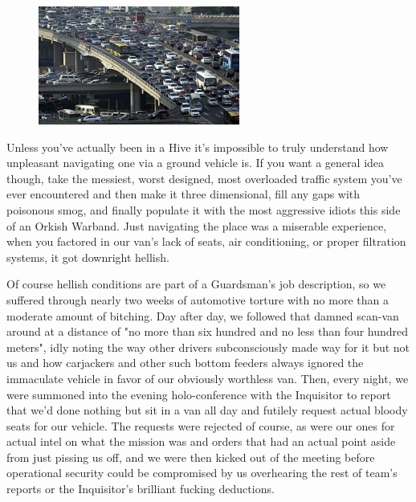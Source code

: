 \begin{figure}
	\begin{center}
		\includegraphics[width=\figwidth]{pics/17/30.png}
	\end{center}
\end{figure}
Unless you've actually been in a Hive it's impossible to truly understand how unpleasant navigating one via a ground vehicle is. 
If you want a general idea though, take the messiest, worst designed, most overloaded traffic system you've ever encountered and then make it three dimensional, fill any gaps with poisonous smog, and finally populate it with the most aggressive idiots this side of an Orkish Warband. 
Just navigating the place was a miserable experience, when you factored in our van's lack of seats, air conditioning, or proper filtration systems, it got downright hellish.

Of course hellish conditions are part of a Guardsman's job description, so we suffered through nearly two weeks of automotive torture with no more than a moderate amount of bitching. 
Day after day, we followed that damned scan-van around at a distance of "no more than six hundred and no less than four hundred meters", idly noting the way other drivers subconsciously made way for it but not us and how carjackers and other such bottom feeders always ignored the immaculate vehicle in favor of our obviously worthless van. 
Then, every night, we were summoned into the evening holo-conference with the Inquisitor to report that we'd done nothing but sit in a van all day and futilely request actual bloody seats for our vehicle. 
The requests were rejected of course, as were our ones for actual intel on what the mission was and orders that had an actual point aside from just pissing us off, and we were then kicked out of the meeting before operational security could be compromised by us overhearing the rest of team's reports or the Inquisitor's brilliant fucking deductions.

